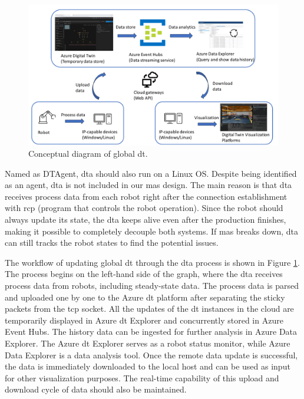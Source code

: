 \begin{figure}[htb]
    \centering
\includegraphics[width=\textwidth]{figures/methodology/DT_Conceptual_Diagram.pdf}
\caption{Conceptual diagram of global \gls{dt}. \label{fig: DTConceptual}}
\end{figure}

Named as DTAgent, \gls{dta} 
should also run on a Linux OS.
Despite being identified as an agent, \gls{dta} is not included in our 
\gls{mas} design. The main reason is that \gls{dta} receives process data from 
each robot right after the connection establishment with \gls{rcp} 
(program that controls the robot operation). Since the robot 
should always update its state, the \gls{dta} keeps alive even 
after the production finishes, making it possible to completely decouple 
both systems. If \gls{mas} breaks down, \gls{dta} can still tracks the robot 
states to find the potential issues. 


The workflow of updating global \gls{dt} through the \gls{dta} process is shown 
in Figure \ref{fig: DTConceptual}. The process begins on the left-hand side of the 
graph, where the \gls{dta} receives process data from robots, including steady-state 
data. The process data is parsed and uploaded one by one to the Azure \gls{dt} 
platform after separating the sticky packets from the \gls{tcp} socket.
All the updates of the \gls{dt} instances in the cloud are temporarily displayed 
in Azure \gls{dt} Explorer and concurrently stored in Azure Event Hubs. The history 
data can be ingested for further analysis in Azure Data Explorer. The Azure \gls{dt} 
Explorer serves as a robot status monitor, while Azure Data Explorer is a data analysis tool.
Once the remote data update is successful, the data is immediately downloaded to the local 
host and can be used as input for other visualization purposes. The real-time capability 
of this upload and download cycle of data should also be maintained.

